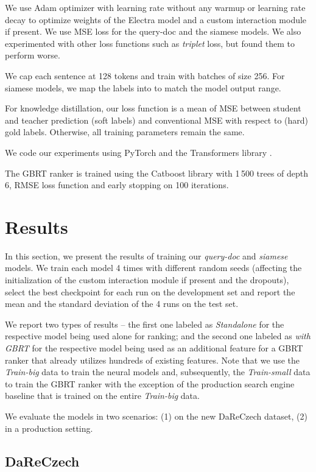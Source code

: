 \documentclass[letterpaper]{article} \usepackage{aaai22 }  \usepackage{times}  \usepackage{helvet}  \usepackage{courier}  \usepackage[hyphens]{url}  \usepackage{graphicx} \usepackage{amsmath,amsfonts,amssymb, mathabx,bm,bbm}
\begin{document}
We use Adam optimizer with learning rate  without any warmup or learning rate decay to optimize weights of the Electra model and a custom interaction module if present. We use MSE loss for the query-doc and the siamese models. We also experimented with other loss functions such as \textit{triplet} loss, but found them to perform worse.

We cap each sentence at 128 tokens and train with batches of size 256. For siamese models, we map the labels into  to match the model output range.

For knowledge distillation, our loss function is a mean of MSE between student and teacher prediction (soft labels) and conventional MSE with respect to (hard) gold labels. Otherwise, all training parameters remain the same.

We code our experiments using PyTorch \cite{pytorch2019} and the Transformers library \cite{transformers2020}.

The GBRT ranker is trained using the Catboost library with 1\,500 trees of depth 6, RMSE loss function and early stopping on 100 iterations.

\section{Results}\label{sec:results}

In this section, we present the results of training our \emph{query-doc} and \emph{siamese} models. We train each model 4 times with different random seeds (affecting the initialization of the custom interaction module if present and the dropouts), select the best checkpoint for each run on the development set and report the mean and the standard deviation of the 4 runs on the test set.

We report two types of results – the first one labeled as \textit{Standalone} for the respective model being used alone for ranking; and the second one labeled as \textit{with GBRT} for the respective model being used as an additional feature for a GBRT ranker that already utilizes hundreds of existing features. Note that we use the \textit{Train-big} data to train the neural models and, subsequently, the \textit{Train-small} data to train the GBRT ranker with the exception of the production search engine baseline that is trained on the entire \textit{Train-big} data.

We evaluate the models in two scenarios: (1) on the new DaReCzech dataset, (2) in a production setting.

\subsection{DaReCzech}
\end{document}
